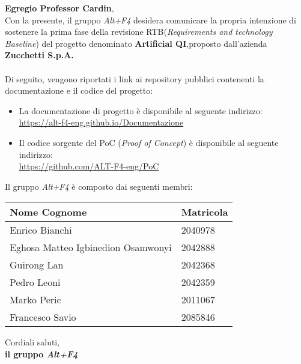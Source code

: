 \documentclass[a4paper, 12pt]{article}
\begin{document}
\primapagina

\newpage

\noindent
\textbf{Egregio Professor Cardin}, \\
Con la presente, il gruppo \textit{Alt+F4} desidera comunicare la propria intenzione di sostenere la prima fase della revisione RTB(\textit{Requirements and technology Baseline}) del progetto denominato \textbf{Artificial QI},proposto dall'azienda  \textbf{Zucchetti S.p.A.}\\
\\
Di seguito, vengono riportati i link ai repository pubblici contenenti la documentazione e il codice del progetto:
\begin{itemize}

\item La documentazione di progetto è disponibile al seguente indirizzo: \\ 
\href{https://alt-f4-eng.github.io/Documentazione}{https://alt-f4-eng.github.io/Documentazione}\\


\item Il codice sorgente del PoC (\textit{Proof of Concept}) è disponibile al seguente indirizzo:\\
\href{https://github.com/ALT-F4-eng/PoC}{https://github.com/ALT-F4-eng/PoC}

\end{itemize}

\noindent
Il gruppo \textit{Alt+F4} è composto dai seguenti membri:
\begin{table}[H]
    \centering
    \begin{tabular}{| l | l |}
    \hline
    \textbf{Nome Cognome} & 
    \textbf{Matricola}\\ 
        \hline
            Enrico Bianchi&
            2040978 \\
        \hline 
            Eghosa Matteo Igbinedion Osamwonyi&
            2042888 \\
        \hline 
            Guirong Lan&
            2042368 \\
        \hline 
            Pedro Leoni&
            2042359 \\
        \hline 
            Marko Peric&
            2011067 \\
        \hline 
            Francesco Savio&
            2085846 \\
        \hline 
    \end{tabular}
\end{table}
\noindent
Cordiali saluti,\\
\textbf{il gruppo \textit{Alt+F4}}
\end{document}
